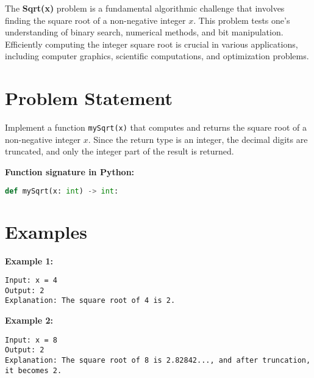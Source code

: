 
\label{chap:Sqrt_x}

The \textbf{Sqrt(x)} problem is a fundamental algorithmic challenge that involves finding the square root of a non-negative integer \(x\). This problem tests one's understanding of binary search, numerical methods, and bit manipulation. Efficiently computing the integer square root is crucial in various applications, including computer graphics, scientific computations, and optimization problems.

\section*{Problem Statement}

Implement a function \texttt{mySqrt(x)} that computes and returns the square root of a non-negative integer \(x\). Since the return type is an integer, the decimal digits are truncated, and only the integer part of the result is returned.

\textbf{Function signature in Python:}
\begin{lstlisting}[language=Python]
def mySqrt(x: int) -> int:
\end{lstlisting}

\section*{Examples}

\textbf{Example 1:}

\begin{verbatim}
Input: x = 4
Output: 2
Explanation: The square root of 4 is 2.
\end{verbatim}

\textbf{Example 2:}

\begin{verbatim}
Input: x = 8
Output: 2
Explanation: The square root of 8 is 2.82842..., and after truncation, it becomes 2.
\end{verbatim}

